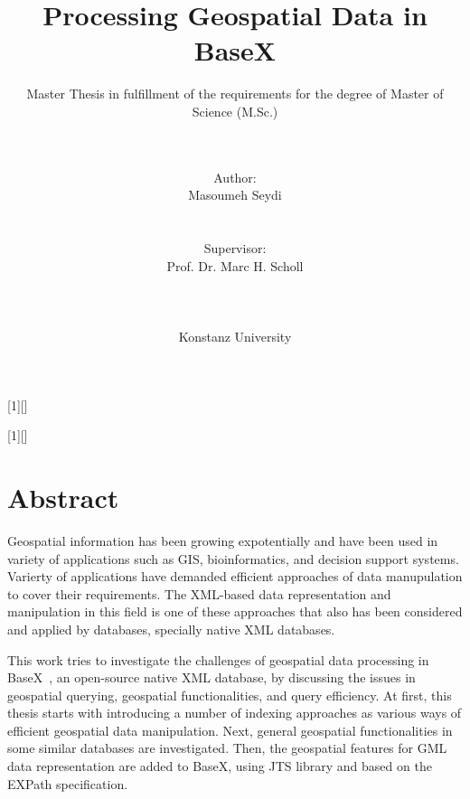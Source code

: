 \documentclass[a4paper,12pt]{article}
\title{Processing Geospatial Data in BaseX}
\subtitle{Master Thesis in fulfillment of the requirements for the degree of
Master of Science (M.Sc.)}
\author{\\\\Author: \\
	Masoumeh Seydi
	\\\\\\Supervisor: \\
	Prof. Dr. Marc H. Scholl \\ 
	\\\\\\
	Konstanz University}
\begin{document}
[1][]{
\lstset{#1}}{}

[1][]{
\lstset{#1}}{}


\renewcommand{\lstlistingname}{Code}


\maketitle
\thispagestyle{empty}

\newpage
\section*{Abstract}
Geospatial information has been growing expotentially and have been used in variety of applications such as GIS, bioinformatics, and decision support systems. 
Varierty of applications have demanded efficient approaches of data manupulation to cover their requirements. 
The XML-based data representation and manipulation in this field is one of these approaches that also has been considered and applied by databases, specially native XML databases. 

This work tries to investigate the challenges of geospatial data processing in BaseX~\cite{www/basex}, an open-source native XML database, by discussing the issues in geospatial querying, geospatial functionalities, and query efficiency. 
At first, this thesis starts with introducing a number of indexing approaches as various ways of efficient geospatial data manipulation. 
Next, general geospatial functionalities in some similar databases are investigated. 
Then, the geospatial features for GML~\cite{gml} data representation are added to BaseX, using JTS library and based on the EXPath specification.
\end{document}
